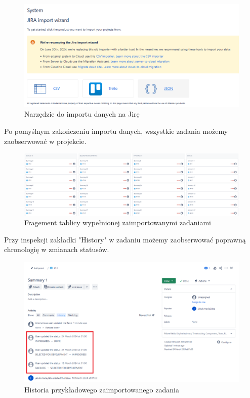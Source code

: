 \begin{figure}[H]
    \centering
    \includegraphics[width=15cm,keepaspectratio]{rysunki/jira-import-wizard.png}
    \caption{Narzędzie do importu danych na Jirę}
\end{figure}

Po pomyślnym zakończeniu importu danych, wszystkie zadania możemy zaobserwować w projekcie.
\begin{figure}[H]
    \centering
    \includegraphics[width=15cm,keepaspectratio]{rysunki/jira-board.png}
    \caption{Fragement tablicy wypełnionej zaimportowanymi zadaniami}
\end{figure}

Przy inspekcji zakładki "History" w zadaniu możemy zaobserwować poprawną chronologię w zmianach statusów.
\begin{figure}[H]
    \centering
    \includegraphics[width=15cm,keepaspectratio]{rysunki/jira-issue-history.png}
    \caption{Historia przykładowego zaimportowanego zadania}
\end{figure}
